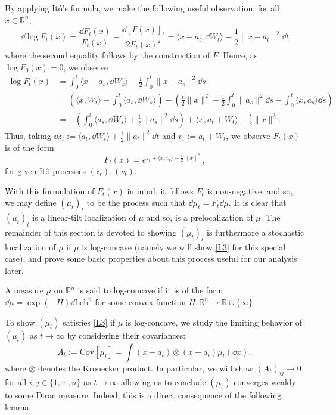 By applying Itô's formula, we make the following useful observation: for all \(x \in \mathbb{R}^n\),
\begin{equation}
  \dd \log F_t(x) = \frac{\dd F_t(x)}{F_t(x)} - \frac{\dd\hspace{0pt} [F(x)]_t}{2F_t(x)^2} 
    = \langle x - a_t, \dd W_t \rangle - \frac{1}{2}\|x - a_t\|^2 \dd t
\end{equation}
where the second equality follows by the construction of \(F\). Hence, as \(\log F_0(x) = 0\), we 
observe
\begin{align*}
  \log F_t(x) & = \int_0^t \langle x - a_s, \dd W_s \rangle - \frac{1}{2}\int_0^t \|x - a_s\|^2 \dd s\\
    & = \left(\langle x, W_t \rangle - \int_0^t \langle a_s, \dd W_s \rangle\right)
      - \left(\frac{t}{2}\|x\|^2 + \frac{1}{2}\int_0^t\|a_s\|^2 \dd s - \int_0^t \langle x, a_s \rangle \dd s\right)\\
    & = - \left(\int_0^t \langle a_s, \dd W_s \rangle + \frac{1}{2}\|a_s\|^2 \dd s\right) + 
      \langle x, a_t + W_t \rangle - \frac{t}{2}\|x\|^2.
\end{align*}
Thus, taking \(\dd z_t := \langle a_t, \dd W_t\rangle + \frac{1}{2} \|a_t\|^2 \dd t\) and 
\(v_t := a_t + W_t\), we observe \(F_t(x)\) is of the form
\begin{equation}\label{eq:stoch_loc_alt}
  F_t(x) = e^{z_t + \langle x, v_t \rangle - \frac{t}{2}\|x\|^2},
\end{equation}
for given Itô processes \((z_t), (v_t)\).

With this formulation of \(F_t(x)\) in mind, it follows \(F_t\) is non-negative, and so, 
we may define \((\mu_t)_t\) to be the process such that \(\dd \mu_t = F_t \dd \mu\). It is clear that 
\((\mu_t)_t\) is a linear-tilt localization of \(\mu\) and so, is a prelocalization of \(\mu\).
The remainder of this section is devoted to showing \((\mu_t)_t\) is furthermore a stochastic localization 
of \(\mu\) if \(\mu\) is log-concave (namely we will show \ref{L3} for this special case), and prove 
some basic properties about this process useful for our analysis later.

\begin{definition}
  A measure \(\mu\) on \(\mathbb{R}^n\) is said to log-concave if it is of the form 
  \(\dd \mu = \exp(-H)\dd\text{Leb}^n\) for some convex function \(H : \mathbb{R}^n \to \mathbb{R} \cup \{\infty\}\)
\end{definition}

To show \((\mu_t)\) satisfies \ref{L3} if \(\mu\) is log-concave, we study the limiting behavior of 
\((\mu_t)\) as \(t \to \infty\) by considering their covariances:
\begin{equation}
  A_t := \text{Cov}[\mu_t] = \int (x - a_t) \otimes (x - a_t) \mu_t(\dd x),
\end{equation}
where \(\otimes\) denotes the Kronecker product. In particular, we will show \((A_t)_{ij} \to 0\) for all
 \(i, j \in \{1, \cdots, n\}\) as \(t \to \infty\) allowing us to conclude \((\mu_t)\) converges weakly 
 to some Dirac measure. Indeed, this is a direct consequence of the following lemma.

